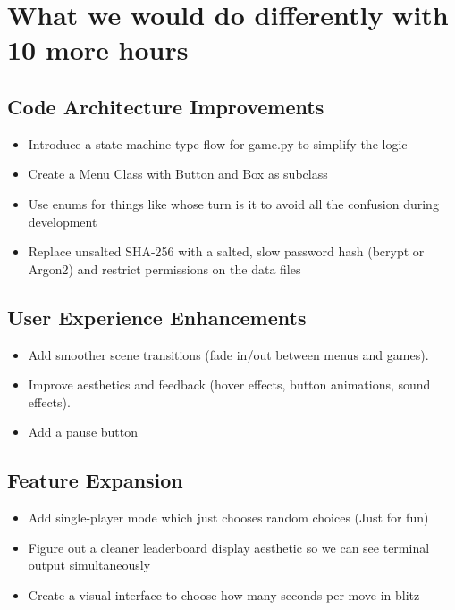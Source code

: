 \documentclass[12pt]{article}
\begin{document}
\section{What we would do differently with 10 more hours}

\subsection{Code Architecture Improvements}
\begin{itemize}
\item Introduce a state-machine type flow for game.py to simplify the logic 
\item Create a Menu Class with Button and Box as subclass
\item Use enums for things like whose turn is it to avoid all the confusion during development
\item Replace unsalted SHA-256 with a salted, slow password hash (bcrypt or Argon2) and restrict permissions on the data files
\end{itemize}

\subsection{User Experience Enhancements}
\begin{itemize}
\item Add smoother scene transitions (fade in/out between menus and games).
\item Improve aesthetics and feedback (hover effects, button animations, sound effects).
\item Add a pause button
\end{itemize}

\subsection{Feature Expansion}
\begin{itemize}
\item Add single-player mode which just chooses random choices (Just for fun)
\item Figure out a cleaner leaderboard display aesthetic so we can see terminal output simultaneously
\item Create a visual interface to choose how many seconds per move in blitz
\end{itemize}

\nocite{*}
\printbibliography
\end{document}
